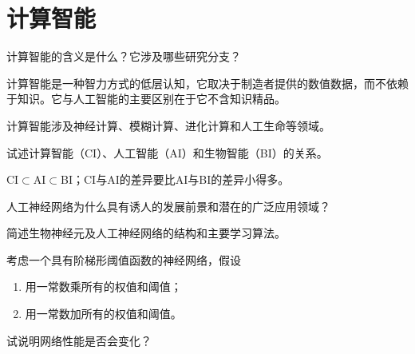 \chapter{计算智能}

\begin{question}
计算智能的含义是什么？它涉及哪些研究分支？
\end{question}
\begin{solution}
计算智能是一种智力方式的低层认知，它取决于制造者提供的数值数据，而不依赖于知识。它与人工智能的主要区别在于它不含知识精品。\par
计算智能涉及神经计算、模糊计算、进化计算和人工生命等领域。
\end{solution}

\begin{question}
试述计算智能（CI）、人工智能（AI）和生物智能（BI）的关系。
\end{question}
\begin{solution}
CI$\subset$AI$\subset$BI；CI与AI的差异要比AI与BI的差异小得多。
\end{solution}

\begin{question}
人工神经网络为什么具有诱人的发展前景和潜在的广泛应用领域？
\end{question}
\begin{solution}
\end{solution}

\begin{question}
简述生物神经元及人工神经网络的结构和主要学习算法。
\end{question}
\begin{solution}
\end{solution}

\begin{question}
考虑一个具有阶梯形阈值函数的神经网络，假设
	\begin{enumerate}
		\item 用一常数乘所有的权值和阈值；
		\item 用一常数加所有的权值和阈值。
	\end{enumerate}
试说明网络性能是否会变化？
\end{question}
\begin{solution}
\end{solution}


